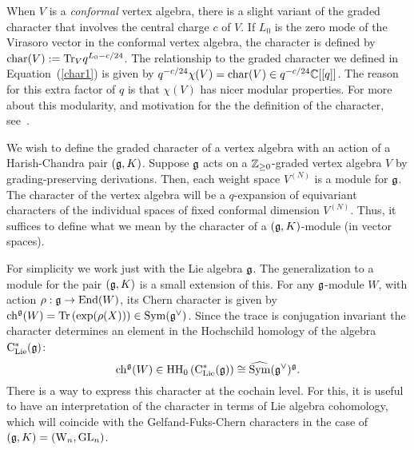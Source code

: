 \begin{rmk} 
When $V$ is a {\em conformal} vertex algebra, there is a slight variant of the graded character that involves the central charge $c$ of $V$. 
If $L_0$ is the zero mode of the Virasoro vector in the conformal vertex algebra, 
the character is defined by ${\rm char}(V) := {\rm Tr}_{V} q^{L_0 - c/24}$. 
The relationship to the graded character we defined in Equation~(\ref{char1}) is given by $q^{-c/24} \chi(V) =  {\rm char}(V) \in q^{-c/24} \mathbb C[[q]]$. 
The reason for this extra factor of $q$ is that $\chi(V)$ has nicer modular properties. 
For more about this modularity, and motivation for the the definition of the character, see~\cite{Zhu}. 
\end{rmk}

We wish to define the graded character of a vertex algebra with an action of a Harish-Chandra pair $(\mathfrak g, K)$. 
Suppose $\mathfrak g$ acts on a  $\mathbb Z_{\geq 0}$-graded vertex algebra $V$ by grading-preserving derivations. 
Then, each weight space $V^{(N)}$ is a module for $\mathfrak g$. 
The character of the vertex algebra will be a $q$-expansion of equivariant characters of the individual spaces of fixed conformal dimension $V^{(N)}$. 
Thus, it suffices to define what we mean by the character of a $(\mathfrak g,K)$-module (in vector spaces). 

For simplicity we work just with the Lie algebra $\mathfrak g$. The generalization to a module for the pair $(\mathfrak g, K)$ is a small extension of this. For any $\mathfrak g$-module $W$, with action $\rho : \mathfrak g \to {\rm End}(W)$, its Chern character is given by ${\rm ch}^\mathfrak g(W) = {\rm Tr}\left(\exp(\rho(X)) \right) \in {\rm Sym}(\mathfrak g^\vee)$. 
Since the trace is conjugation invariant the character determines an element in the Hochschild homology of the algebra ${\rm C}_{{\rm Lie}}^*(\mathfrak g)$:
\[
{\rm ch}^\mathfrak g(W) \in {\rm HH}_0\left( {\rm C}_{{\rm Lie}}^*(\mathfrak g) \right) \cong
\widehat{{\rm Sym}} (\mathfrak g^\vee)^\mathfrak g .
\]
There is a way to express this character at the cochain level. For this, it is useful to have an interpretation of the character in terms of Lie algebra cohomology, which will coincide with the Gelfand-Fuks-Chern characters in the case of $(\mathfrak g, K) = ({{\rm W}_n}, {\rm GL}_n)$. 

